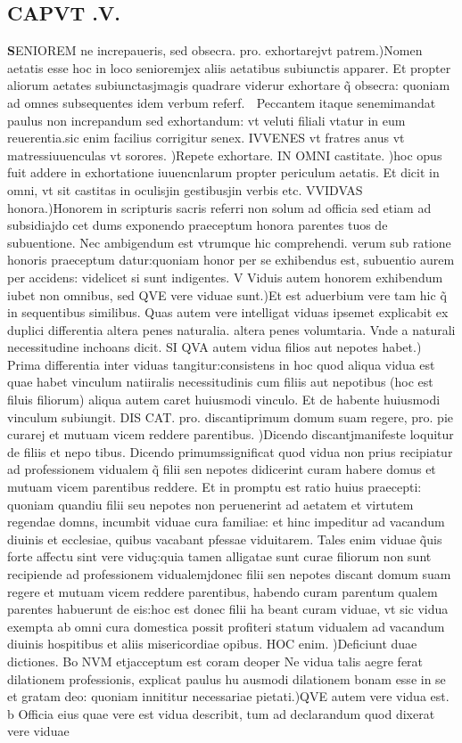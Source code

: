 \documentclass{article}
\begin{document}
\begin{pages}
\endnumbering\beginnumbering\section{CAPVT .V.}\pstart \huge\textbf{S}\normalsize ENIOREM ne increpaueris, sed obsecra. pro. exhortarejvt patrem.)Nomen aetatis esse hoc in loco senioremjex aliis aetatibus subiunctis apparer. Et propter aliorum aetates subiunctasjmagis quadrare viderur exhortare q̃ obsecra: quoniam ad omnes subsequentes idem verbum referf.  Peccantem itaque senemimandat paulus non increpandum sed exhortandum: vt veluti filiali vtatur in eum reuerentia.sic enim facilius corrigitur senex. IVVENES vt fratres anus vt matressiuuenculas vt sorores. )Repete exhortare. IN OMNI castitate. )hoc opus fuit addere in exhortatione iuuencnlarum propter periculum aetatis. Et dicit in omni, vt sit castitas in oculisjin gestibusjin verbis etc. VVIDVAS honora.)Honorem in scripturis sacris referri non solum ad officia sed etiam ad subsidiajdo cet dums exponendo praeceptum honora parentes tuos de subuentione. Nec ambigendum est vtrumque hic comprehendi. verum sub ratione honoris praeceptum datur:quoniam honor per se exhibendus est, subuentio aurem per accidens: videlicet si sunt indigentes. V Viduis autem honorem exhibendum iubet non omnibus, sed QVE vere viduae sunt.)Et est aduerbium vere tam hic q̃ in sequentibus similibus. Quas autem vere intelligat viduas ipsemet explicabit ex duplici differentia altera penes naturalia. altera penes volumtaria. Vnde a naturali necessitudine inchoans dicit. SI QVA autem vidua filios aut nepotes habet.) Prima differentia inter viduas tangitur:consistens in hoc quod aliqua vidua est quae habet vinculum natiiralis necessitudinis cum filiis aut nepotibus (hoc est filuis filiorum) aliqua autem caret huiusmodi vinculo. Et de habente huiusmodi vinculum subiungit. DIS CAT. pro. discantiprimum domum suam regere, pro. pie curarej et mutuam vicem reddere parentibus. )Dicendo discantjmanifeste loquitur de filiis et nepo tibus. Dicendo primumssignificat quod vidua non prius recipiatur ad professionem vidualem q̃ filii sen nepotes didicerint curam habere domus et mutuam vicem parentibus reddere. Et in promptu est ratio huius praecepti: quoniam quandiu filii seu nepotes non peruenerint ad aetatem et virtutem regendae domns, incumbit viduae cura familiae: et hinc impeditur ad vacandum diuinis et ecclesiae, quibus vacabant pfessae viduitarem. Tales enim viduae q̃uis forte affectu sint vere viduç:quia tamen alligatae sunt curae filiorum non sunt recipiende ad professionem vidualemjdonec filii sen nepotes discant domum suam regere et mutuam vicem reddere parentibus, habendo curam parentum qualem parentes habuerunt de eis:hoc est donec filii ha beant curam viduae, vt sic vidua exempta ab omni cura domestica possit profiteri statum vidualem ad vacandum diuinis hospitibus et aliis misericordiae opibus. HOC enim. )Deficiunt duae dictiones. Bo NVM etjacceptum est coram deoper Ne vidua talis aegre ferat dilationem professionis, explicat paulus hu ausmodi dilationem bonam esse in se et gratam deo: quoniam innititur necessariae pietati.)QVE autem vere vidua est. b Officia eius quae vere est vidua describit, tum ad declarandum quod dixerat vere viduae 
\end{pages}
\end{document}
